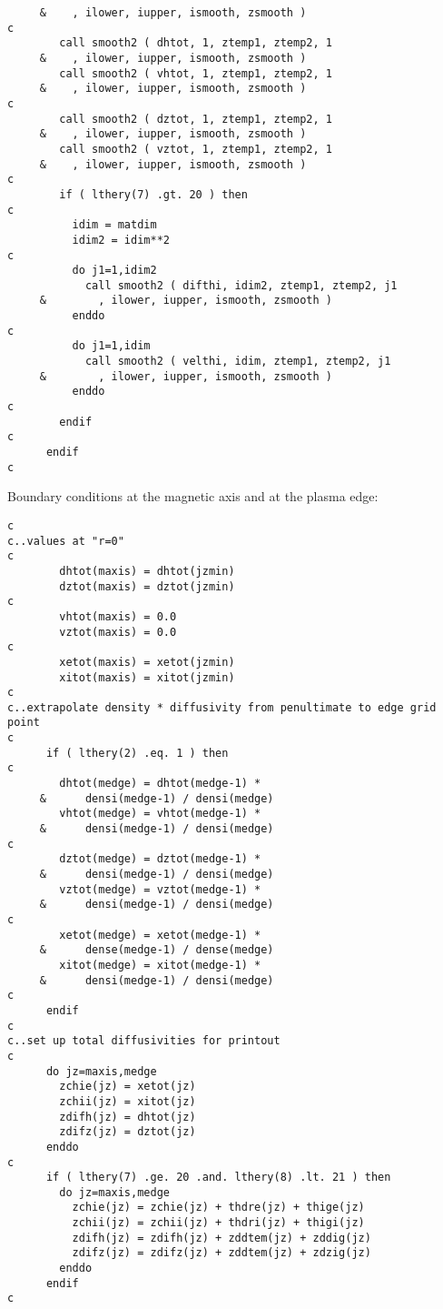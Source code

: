 \begin{verbatim}
     &    , ilower, iupper, ismooth, zsmooth )
c
        call smooth2 ( dhtot, 1, ztemp1, ztemp2, 1
     &    , ilower, iupper, ismooth, zsmooth )
        call smooth2 ( vhtot, 1, ztemp1, ztemp2, 1
     &    , ilower, iupper, ismooth, zsmooth )
c
        call smooth2 ( dztot, 1, ztemp1, ztemp2, 1
     &    , ilower, iupper, ismooth, zsmooth )
        call smooth2 ( vztot, 1, ztemp1, ztemp2, 1
     &    , ilower, iupper, ismooth, zsmooth )
c
        if ( lthery(7) .gt. 20 ) then
c
          idim = matdim
          idim2 = idim**2
c
          do j1=1,idim2
            call smooth2 ( difthi, idim2, ztemp1, ztemp2, j1
     &        , ilower, iupper, ismooth, zsmooth )
          enddo
c
          do j1=1,idim
            call smooth2 ( velthi, idim, ztemp1, ztemp2, j1
     &        , ilower, iupper, ismooth, zsmooth )
          enddo
c
        endif
c
      endif
c
\end{verbatim}

Boundary conditions at the magnetic axis and at the plasma edge:

\begin{verbatim}
c
c..values at "r=0"
c
        dhtot(maxis) = dhtot(jzmin)
        dztot(maxis) = dztot(jzmin)
c
        vhtot(maxis) = 0.0
        vztot(maxis) = 0.0
c
        xetot(maxis) = xetot(jzmin)
        xitot(maxis) = xitot(jzmin)
c
c..extrapolate density * diffusivity from penultimate to edge grid point
c
      if ( lthery(2) .eq. 1 ) then
c
        dhtot(medge) = dhtot(medge-1) *
     &      densi(medge-1) / densi(medge)
        vhtot(medge) = vhtot(medge-1) *
     &      densi(medge-1) / densi(medge)
c
        dztot(medge) = dztot(medge-1) *
     &      densi(medge-1) / densi(medge)
        vztot(medge) = vztot(medge-1) *
     &      densi(medge-1) / densi(medge)
c
        xetot(medge) = xetot(medge-1) *
     &      dense(medge-1) / dense(medge)
        xitot(medge) = xitot(medge-1) *
     &      densi(medge-1) / densi(medge)
c
      endif
c
c..set up total diffusivities for printout
c
      do jz=maxis,medge
        zchie(jz) = xetot(jz)
        zchii(jz) = xitot(jz)
        zdifh(jz) = dhtot(jz)
        zdifz(jz) = dztot(jz)
      enddo
c
      if ( lthery(7) .ge. 20 .and. lthery(8) .lt. 21 ) then
        do jz=maxis,medge
          zchie(jz) = zchie(jz) + thdre(jz) + thige(jz)
          zchii(jz) = zchii(jz) + thdri(jz) + thigi(jz)
          zdifh(jz) = zdifh(jz) + zddtem(jz) + zddig(jz)
          zdifz(jz) = zdifz(jz) + zddtem(jz) + zdzig(jz)
        enddo
      endif
c
\end{verbatim}

